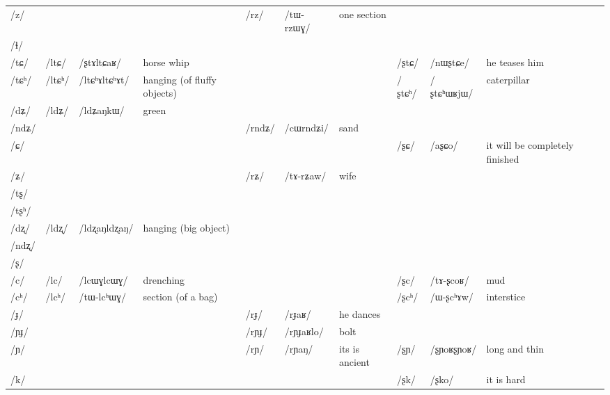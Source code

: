 \documentclass[oldfontcommands,oneside,a4paper,11pt]{article}
\newcommand{\ipa}[1]{/#1/} %
\newcommand{\deux}[1]{/#1/}
\newcommand{\tib}[1]{\cellcolor{lightgray}\textbf{#1}}
\newcommand{\idph}[1]{\cellcolor{gray}\textbf{#1}}
\begin{document}
\begin{table}
{\begin{tabular}{l|lll|lll|lll|l}
\ipa{z}  & 	  & 	  & 	  & 	 \deux{rz}  & 	 \ipa{tɯ-rzɯɣ}  & 	 one section & 	 & 	 & 	 & 	\\	
\ipa{ɬ}  & 	  & 	  & 	  & 	  & 	  & 	  & 	 & 	 & 	 & 	\\	
\ipa{tɕ}  & 	 \deux{ltɕ}  & 	 \ipa{ʂtɤltɕaʁ}  & 	 horse whip  & 	 & 	 & 	 & 	 \deux{ʂtɕ}  & 	 \ipa{nɯʂtɕe}  & 	he teases him  & 	\\	
\ipa{tɕʰ}  & 	 \deux{ltɕʰ} \idph{}  & 	 \ipa{ltɕʰɤltɕʰɤt}  & 	hanging (of fluffy objects)  & 	 & 	 & 	 & 	 \deux{ʂtɕʰ}  & 	 \ipa{ʂtɕʰɯʁjɯ}  & 	caterpillar  & 	\\	
\ipa{dʑ}  & 	 \deux{ldʑ} \tib{}  & 	 \ipa{ldʑaŋkɯ}  & 	 green & 	  & 	  & 	  & 	 & 	 & 	 & 	\\	
\ipa{ndʑ}  & 	  & 	  & 	  & 	 \deux{rndʑ}  & 	 \ipa{cɯrndʑi}  & 	sand  & 	 & 	 & 	 & 	\\	
\ipa{ɕ}  & 	  & 	  & 	  & 	 & 	 & 	 & 	 \deux{ʂɕ}  & 	 \ipa{aʂɕo}  & 	 it will be completely finished  & 	\\	
\ipa{ʑ}  & 	  & 	  & 	  & 	 \deux{rʑ}  & 	 \ipa{tɤ-rʑaw}  & 	wife  & 	 & 	 & 	 & 	\\	
\ipa{tʂ}  & 	  & 	  & 	  & 	  & 	  & 	  & 	 & 	 & 	 & 	\\	
\ipa{tʂʰ}  & 	  & 	  & 	  & 	  & 	  & 	  & 	 & 	 & 	 & 	\\	
\ipa{dʐ}  & 	 \deux{ldʐ} \idph{}  & 	 \ipa{ldʐaŋldʐaŋ}  & 	 hanging (big object) & 	  & 	  & 	  & 	 & 	 & 	 & 	\\	
\ipa{ndʐ}  & 	  & 	  & 	  & 	  & 	  & 	  & 	 & 	 & 	 & 	\\	
\ipa{ʂ}  & 	  & 	  & 	  & 	  & 	  & 	  & 	 & 	 & 	 & 	\\	
\ipa{c}  & 	 \deux{lc} \idph{} & 	 \ipa{lcɯɣlcɯɣ}  & 	 drenching & 	 & 	 & 	 & 	 \deux{ʂc}  & 	 \ipa{tɤ-ʂcoʁ}  & 	 mud & 	\\	
\ipa{cʰ}  & 	 \deux{lcʰ}  & 	 \ipa{tɯ-lcʰɯɣ}  & 	 section (of a bag) & 	 & 	 & 	 & 	 \deux{ʂcʰ}  & 	 \ipa{ɯ-ʂcʰɤw}  & 	 interstice & 	\\	
\ipa{ɟ}  & 	  & 	  & 	  & 	 \deux{rɟ}  & 	 \ipa{rɟaʁ}  & 	he dances  & 	 & 	 & 	 & 	\\	
\ipa{ɲɟ}  & 	  & 	  & 	  & 	 \deux{rɲɟ}  & 	 \ipa{rɲɟaʁlo}  & 	 bolt & 	 & 	 & 	 & 	\\	
\ipa{ɲ}  & 	  & 	  & 	  & 	 \deux{rɲ}  & 	 \ipa{rɲaŋ}  & 	 its is ancient & 	 \deux{ʂɲ} \idph{}  & 	\ipa{ʂɲoʁʂɲoʁ} & 	long and thin & 	\\	
\ipa{k}  & 	  & 	  & 	  & 	 & 	 & 	 & 	 \deux{ʂk}  & 	 \ipa{ʂko}  & 	 it is hard & 	\\	

\end{tabular}}
\end{table}
\end{document}
